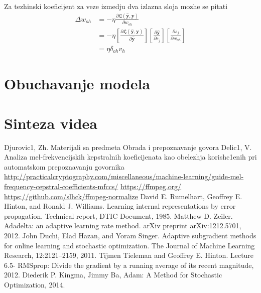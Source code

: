 \documentclass[a4paper, openany, oneside, 11pt]{book}
\begin{document}
Za tezhinski koeficijent za veze izmedju dva izlazna sloja mozhe se pitati
\begin{align}
\Delta w_{oh} &= -\eta\frac{\partial \mathfrak{L}\left(\mathbf{\hat{y}}, \mathbf{y}\right)}{\partial w_{oh}}\\
&=-\eta\left[\frac{\partial \mathfrak{L}\left(\mathbf{\hat{y}}, \mathbf{y}\right)}{\partial \mathbf{\hat{y}}}\right]\left[\frac{\partial \mathbf{\hat{y}}}{\partial s_j}\right]\left[\frac{\partial s_j}{\partial w_{oh}}\right]\\
&=\eta \delta_{oh}v_h
\end{align}
\chapter{Obuchavanje modela}

\chapter{Sinteza videa}


\begin{thebibliography}{99}

Djurovic1, Zh. Materijali sa predmeta Obrada i prepoznavanje govora
Delic1, V. Analiza mel-frekvencijskih kepstralnih koeficijenata kao obelezhja korish\-c1enih pri automat\-skom prepoznavanju govornika
\selectfont
\url{http://practicalcryptography.com/miscellaneous/machine-learning/guide-mel-frequency-cepstral-coefficients-mfccs/}
\url{https://ffmpeg.org/}
\url{https://github.com/slhck/ffmpeg-normalize}
David E. Rumelhart, Geoffrey E. Hinton, and Ronald J. Williams. Learning
internal representations by error propagation. Technical report, DTIC Document, 1985.
Matthew D. Zeiler. Adadelta: an adaptive learning rate method. arXiv preprint arXiv:1212.5701, 2012.
John Duchi, Elad Hazan, and Yoram Singer. Adaptive subgradient methods for
online learning and stochastic optimization. The Journal of Machine Learning Research, 12:2121–2159, 2011.
Tijmen Tieleman and Geoffrey E. Hinton. Lecture 6.5- RMSprop: Divide
the gradient by a running average of its recent magnitude, 2012.
Diederik P. Kingma, Jimmy Ba, Adam: A Method for Stochastic Optimization, 2014.


\end{thebibliography}
\end{document}
